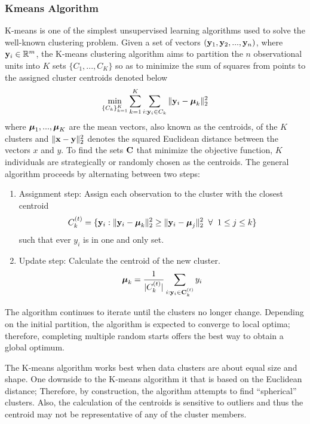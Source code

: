 \subsubsection{Kmeans Algorithm}
K-means \cite{macqueen1967} is one of the simplest unsupervised learning algorithms used to solve the well-known clustering problem. Given a set of vectors $(\mathbf y_{1},\mathbf y_{2},...,\mathbf y_{n})$, where $\mathbf y_{i}\in\mathbb{R}^{m}$, the K-means clustering algorithm aims to partition the $n$ observational units into $K$ sets $\{C_{1},...,C_{K}\}$ so as to minimize the sum of squares from points to the assigned cluster centroids denoted below
$$\min_{\{C_{k}\}_{k=1}^{K}}\sum_{k=1}^{K}\sum_{i: \mathbf y_{i}\in C_{k}}\|\mathbf y_{i} -\boldsymbol \mu_{k}\|_{2}^{2}$$
where $\boldsymbol\mu_{1},...,\boldsymbol\mu_{K}$ are the mean vectors, also known as the centroids, of the $K$ clusters and $\|\mathbf x-\mathbf y\|_{2}^{2}$ denotes the squared Euclidean distance between the vectors $x$ and $y$. To find the sets $\mathbf C$ that minimize the objective function, $K$ individuals are  strategically or randomly chosen as the centroids. The general algorithm proceeds by alternating between two steps:
\begin{enumerate}
\item Assignment step: Assign each observation to the cluster with the closest centroid
$$ C_{k}^{(t)} = \{\mathbf y_{i}: \|\mathbf y_{i} - \boldsymbol\mu_{k}\|_{2}^{2}\geq \|\mathbf y_{i} - \boldsymbol\mu_{j}\|_{2}^{2} \;\;\forall\;\; 1\leq j\leq k\}$$
such that ever $y_{i}$ is in one and only set.
\item Update step: Calculate the centroid of the new cluster.
$$\boldsymbol\mu_{k} = \frac{1}{|C_{k}^{(t)}|}\sum_{i: \mathbf y_{i}\in\mathbf C_{k}^{(t)}} y_{i}$$
\end{enumerate}
The algorithm continues to iterate until the clusters no longer change. Depending on the initial partition, the algorithm is expected to converge to local optima; therefore, completing multiple random starts offers the best way to obtain a global optimum. 

The K-means algorithm works best when data clusters are about equal size and shape. One downside to the K-means algorithm it that is based on the Euclidean distance; Therefore, by construction, the algorithm attempts to find ``spherical'' clusters. Also, the calculation of the centroids is sensitive to outliers and thus the centroid may not be representative of any of the cluster members.

